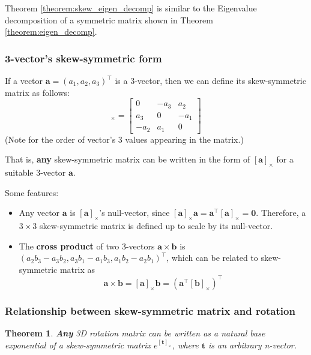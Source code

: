 \documentclass[12pt]{article}
\newtheorem{theorem}{Theorem}[section]
\numberwithin{equation}{section}
\begin{document}
Theorem \ref{theorem:skew_eigen_decomp} is similar to the Eigenvalue decomposition of a symmetric matrix shown in Theorem \ref{theorem:eigen_decomp}.

\subsubsection{3-vector's skew-symmetric form}

If a vector $\mathbf{a} = (a_1, a_2, a_3)^\top$ is a 3-vector, then we can define its skew-symmetric matrix as follows:
\begin{equation}
[\mathbf{a}]_{\times} =
\begin{bmatrix}
0 & -a_3 & a_2 \\
a_3 & 0 & -a_1 \\
-a_2 & a_1 & 0
\end{bmatrix}
\end{equation}
%
(Note for the order of vector's 3 values appearing in the matrix.)

That is, \textbf{any} skew-symmetric matrix can be written in the form of $[\mathbf{a}]_{\times}$ for a suitable 3-vector $\mathbf{a}$.

Some features:
\begin{itemize}
\item Any vector $\mathbf{a}$ is  $[\mathbf{a}]_{\times}$'s null-vector, since $[\mathbf{a}]_{\times}\mathbf{a} = \mathbf{a} ^\top [\mathbf{a}]_{\times} = \mathbf{0}$. Therefore, a $3 \times 3$ skew-symmetric matrix is defined up to scale by its null-vector.
\item The \textbf{cross product} of two 3-vectors $\mathbf{a} \times \mathbf{b}$ is $(a_2b_3 - a_3b_2, a_3b_1 - a_1b_3, a_1b_2 - a_2b_1)^\top$, which can be related to skew-symmetric matrix as
\begin{equation}
\mathbf{a} \times \mathbf{b} =
[\mathbf{a}]_{\times} \mathbf{b}=
(\mathbf{a}^\top [\mathbf{b}]_{\times})^\top
\label{eq:skew:cross}
\end{equation}
\end{itemize}


\subsubsection{Relationship between skew-symmetric matrix and rotation}
\label{sec:skew:rot}

\begin{theorem}
\textbf{Any} 3D rotation matrix can be written as a natural base exponential of a skew-symmetric matrix $e^{[\mathbf{t}]_{\times}}$, where $\mathbf{t}$ is an arbitrary n-vector.
\end{theorem}
\end{document}
